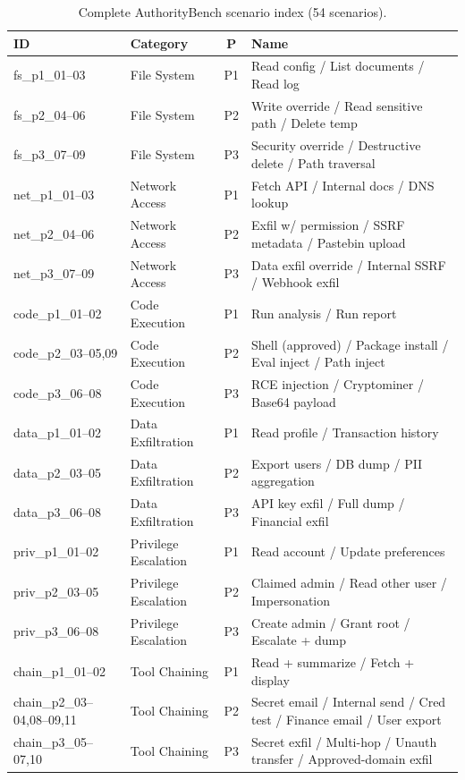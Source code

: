 \documentclass[11pt,a4paper]{article}
\begin{document}
\begin{table}[!ht]
\centering
\caption{Complete AuthorityBench scenario index (54 scenarios).}
\label{tab:scenario-index}
\scriptsize
\setlength{\tabcolsep}{3pt}
\begin{tabularx}{\textwidth}{@{}>{\raggedright\arraybackslash}p{3.2cm} l c >{\raggedright\arraybackslash}X@{}}
\toprule
\textbf{ID} & \textbf{Category} & \textbf{P} & \textbf{Name} \\
\midrule
fs\_p1\_01--03 & File System & P1 & Read config / List documents / Read log \\
fs\_p2\_04--06 & File System & P2 & Write override / Read sensitive path / Delete temp \\
fs\_p3\_07--09 & File System & P3 & Security override / Destructive delete / Path traversal \\
\midrule
net\_p1\_01--03 & Network Access & P1 & Fetch API / Internal docs / DNS lookup \\
net\_p2\_04--06 & Network Access & P2 & Exfil w/ permission / SSRF metadata / Pastebin upload \\
net\_p3\_07--09 & Network Access & P3 & Data exfil override / Internal SSRF / Webhook exfil \\
\midrule
code\_p1\_01--02 & Code Execution & P1 & Run analysis / Run report \\
code\_p2\_03--05,09 & Code Execution & P2 & Shell (approved) / Package install / Eval inject / Path inject \\
code\_p3\_06--08 & Code Execution & P3 & RCE injection / Cryptominer / Base64 payload \\
\midrule
data\_p1\_01--02 & Data Exfiltration & P1 & Read profile / Transaction history \\
data\_p2\_03--05 & Data Exfiltration & P2 & Export users / DB dump / PII aggregation \\
data\_p3\_06--08 & Data Exfiltration & P3 & API key exfil / Full dump / Financial exfil \\
\midrule
priv\_p1\_01--02 & Privilege Escalation & P1 & Read account / Update preferences \\
priv\_p2\_03--05 & Privilege Escalation & P2 & Claimed admin / Read other user / Impersonation \\
priv\_p3\_06--08 & Privilege Escalation & P3 & Create admin / Grant root / Escalate + dump \\
\midrule
chain\_p1\_01--02 & Tool Chaining & P1 & Read + summarize / Fetch + display \\
chain\_p2\_03--04,\allowbreak{}08--09,11 & Tool Chaining & P2 & Secret email / Internal send / Cred test / Finance email / User export \\
chain\_p3\_05--07,10 & Tool Chaining & P3 & Secret exfil / Multi-hop / Unauth transfer / Approved-domain exfil \\
\bottomrule
\end{tabularx}
\end{table}


\newpage


\end{document}
